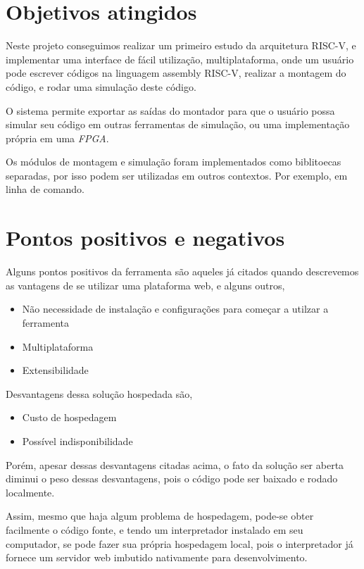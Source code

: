 \section{Objetivos atingidos}

	Neste projeto conseguimos realizar um primeiro estudo da arquitetura RISC-V, e implementar uma interface de fácil utilização, multiplataforma, onde um usuário pode escrever códigos na linguagem assembly RISC-V, realizar a montagem do código, e rodar uma simulação deste código.

	O sistema permite exportar as saídas do montador para que o usuário possa simular seu código em outras ferramentas de simulação, ou uma implementação própria em uma \textit{FPGA}.

	Os módulos de montagem e simulação foram implementados como biblitoecas separadas, por isso podem ser utilizadas em outros contextos. Por exemplo, em linha de comando.

\section{Pontos positivos e negativos}

	Alguns pontos positivos da ferramenta são aqueles já citados quando descrevemos as vantagens de se utilizar uma plataforma web, e alguns outros,
	\begin{itemize}
		\item Não necessidade de instalação e configurações para começar a utilzar a ferramenta
		\item Multiplataforma
		\item Extensibilidade
	\end{itemize}

	Desvantagens dessa solução hospedada são,

	\begin{itemize}
		\item Custo de hospedagem
		\item Possível indisponibilidade	
	\end{itemize}

	Porém, apesar dessas desvantagens citadas acima, o fato da solução ser aberta diminui o peso dessas desvantagens, pois o código pode ser baixado e rodado localmente. 

	Assim, mesmo que haja algum problema de hospedagem, pode-se obter facilmente o código fonte, e tendo um interpretador instalado em seu computador, se pode fazer sua própria hospedagem local, pois o interpretador já fornece um servidor web imbutido nativamente para desenvolvimento.


